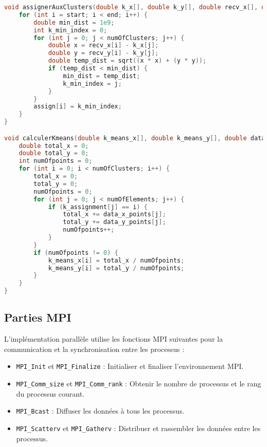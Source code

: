 \documentclass{article}
\begin{document}
\begin{lstlisting}[language=C, caption=Principales fonctions de l'algorithme k-means parallèle]
void assignerAuxClusters(double k_x[], double k_y[], double recv_x[], double recv_y[], int assign[], int start, int end, int numOfClusters) {
    for (int i = start; i < end; i++) {
        double min_dist = 1e9;
        int k_min_index = 0;
        for (int j = 0; j < numOfClusters; j++) {
            double x = recv_x[i] - k_x[j];
            double y = recv_y[i] - k_y[j];
            double temp_dist = sqrt((x * x) + (y * y));
            if (temp_dist < min_dist) {
                min_dist = temp_dist;
                k_min_index = j;
            }
        }
        assign[i] = k_min_index;
    }
}

void calculerKmeans(double k_means_x[], double k_means_y[], double data_x_points[], double data_y_points[], int k_assignment[], int numOfElements, int numOfClusters) {
    double total_x = 0;
    double total_y = 0;
    int numOfpoints = 0;
    for (int i = 0; i < numOfClusters; i++) {
        total_x = 0;
        total_y = 0;
        numOfpoints = 0;
        for (int j = 0; j < numOfElements; j++) {
            if (k_assignment[j] == i) {
                total_x += data_x_points[j];
                total_y += data_y_points[j];
                numOfpoints++;
            }
        }
        if (numOfpoints != 0) {
            k_means_x[i] = total_x / numOfpoints;
            k_means_y[i] = total_y / numOfpoints;
        }
    }
}
\end{lstlisting}

\subsection{Parties MPI}
L'implémentation parallèle utilise les fonctions MPI suivantes pour la communication et la synchronisation entre les processus :
\begin{itemize}
    \item \texttt{MPI\_Init} et \texttt{MPI\_Finalize} : Initialiser et finaliser l'environnement MPI.
    \item \texttt{MPI\_Comm\_size} et \texttt{MPI\_Comm\_rank} : Obtenir le nombre de processus et le rang du processus courant.
    \item \texttt{MPI\_Bcast} : Diffuser les données à tous les processus.
    \item \texttt{MPI\_Scatterv} et \texttt{MPI\_Gatherv} : Distribuer et rassembler les données entre les processus.
\end{itemize}
\end{document}
